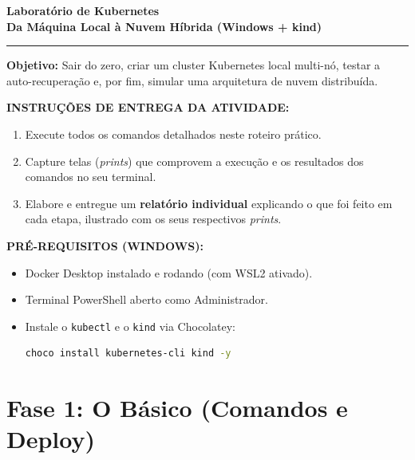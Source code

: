 \documentclass[11pt, a4paper]{article}
\begin{document}
\begin{center}
    {\LARGE \textbf{\color{primary} Laboratório de Kubernetes}} \\[4pt]
    {\large \textbf{\color{accent} Da Máquina Local à Nuvem Híbrida (Windows + kind)}} \\[8pt]
    \rule{\textwidth}{1pt}
\end{center}

\textbf{Objetivo:} Sair do zero, criar um cluster Kubernetes local multi-nó, testar a auto-recuperação e, por fim, simular uma arquitetura de nuvem distribuída.

\begin{tcolorbox}[colback=infobg, colframe=infoframe, arc=3pt, boxrule=0.8pt]
\textbf{INSTRUÇÕES DE ENTREGA DA ATIVIDADE:}
\begin{enumerate}[leftmargin=*, topsep=3pt, itemsep=2pt]
    \item Execute todos os comandos detalhados neste roteiro prático.
    \item Capture telas (\textit{prints}) que comprovem a execução e os resultados dos comandos no seu terminal.
    \item Elabore e entregue um \textbf{relatório individual} explicando o que foi feito em cada etapa, ilustrado com os seus respectivos \textit{prints}.
\end{enumerate}
\end{tcolorbox}

\begin{tcolorbox}[colback=warnbg, colframe=warnframe, arc=3pt, boxrule=0.8pt]
\textbf{PRÉ-REQUISITOS (WINDOWS):}
\begin{itemize}[leftmargin=*, topsep=3pt, itemsep=2pt]
    \item Docker Desktop instalado e rodando (com WSL2 ativado).
    \item Terminal PowerShell aberto como Administrador.
    \item Instale o \texttt{kubectl} e o \texttt{kind} via Chocolatey:
    \begin{lstlisting}[language=bash]
choco install kubernetes-cli kind -y
    \end{lstlisting}
\end{itemize}
\end{tcolorbox}

\section*{Fase 1: O Básico (Comandos e Deploy)}
\end{document}
